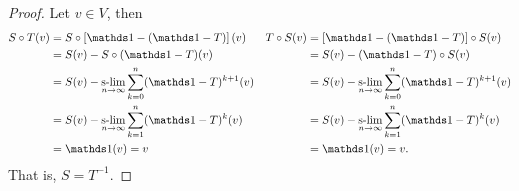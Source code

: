 \begin{proof}
    Let \(v \in V\), then
    \begin{align*}
        S \circ T(v) &= S \circ \left[\unity - (\unity - T)\right](v)&
        T \circ S(v) &= \left[\unity - (\unity - T)\right]\circ S(v)\\
                     &= S(v) - S\circ(\unity - T)(v)&
                     &= S(v) - (\unity - T)\circ S(v)\\
                     &= S(v) - \slim_{n \to \infty} \sum_{k=0}^n (\unity - T)^{k+1}(v)&
                     &= S(v) - \slim_{n \to \infty} \sum_{k=0}^n (\unity - T)^{k+1}(v)\\
                     &= S(v) - \slim_{n\to\infty} \sum_{k=1}^n (\unity - T)^{k}(v)&
                     &= S(v) - \slim_{n\to\infty} \sum_{k=1}^n (\unity - T)^{k}(v)\\
                     &= \unity(v) = v&
                     &= \unity(v) = v.
    \end{align*}
    That is, \(S = T^{-1}\).
\end{proof}

